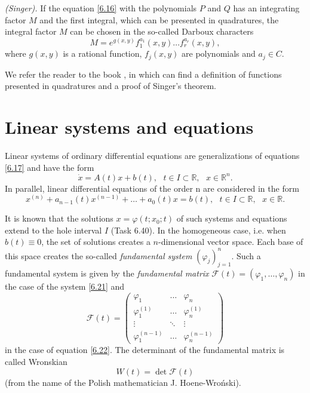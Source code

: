 \begin{theorem}\emph{(Singer).}
	If the equation \eqref{6.16} with the polynomials $P$ and $Q$ has an integrating factor $M$ and the first integral, which can be presented in quadratures, the integral factor $M$ can be chosen in the so-called Darboux characters
	$$
	M=e^{g(x,y)}f_{1}^{a_{1}}(x,y)\ldots f_{r}^{a_{r}}(x,y),
	$$
	where $g (x, y)$ is a rational function, $f_j (x, y)$ are polynomials and $a_j \in C$.
\end{theorem}

We refer the reader to the book \cite{Zol2}, in which can find a definition of functions presented in quadratures and a proof of Singer's theorem.

\section{Linear systems and equations}
Linear systems of ordinary differential equations are generalizations of equations \eqref{6.17} and have the form
\begin{equation}
\label{6.21}
\dot{x}=A(t)x+b(t),\text{ \ \ }t\in I\subset \mathbb{R},\text{ \ \ }x\in
\mathbb{R}^{n}.
\end{equation}
In parallel, linear differential equations of the order n are considered in the form
\begin{equation}
\label{6.22}
x^{(n)}+a_{n-1}(t)x^{(n-1)}+\ldots +a_{0}(t)x=b(t),\text{ \ \ }t\in I\subset
\mathbb{R},\text{ \ \ }x\in \mathbb{R}.
\end{equation}

It is known that the solutions $x=\varphi (t;x_{0};t)$  of such systems and equations extend to the hole interval $I$ (Task 6.40). In the homogeneous case, i.e. when $b(t)\equiv 0$, the set of solutions creates a $n$-dimensional vector space. Each base of this space creates the so-called \emph{fundamental system} $\left( \varphi _{j}\right) _{j=1}^{n}$. Such a fundamental system is given by the \emph{fundamental matrix}
$\mathcal{F}(t)=\left( \varphi
_{1},\ldots ,\varphi _{n}\right) $
in the case of the system \eqref{6.21} and
$$
\mathcal{F}(t)=\left(
\begin{array}{ccc}
\varphi _{1} & \ldots & \varphi _{n} \\
\varphi _{1}^{(1)} & \ldots & \varphi _{n}^{(1)} \\
\vdots & \ddots & \vdots \\
\varphi _{1}^{(n-1)} & \ldots & \varphi _{n}^{(n-1)}%
\end{array}%
\right)
$$
in the case of equation \eqref{6.22}. The determinant of the fundamental matrix is called Wronskian
\begin{equation}
\label{6.23}
W(t)=\det \mathcal{F}(t)
\end{equation}
(from the name of the Polish mathematician J. Hoene-Wroński).

